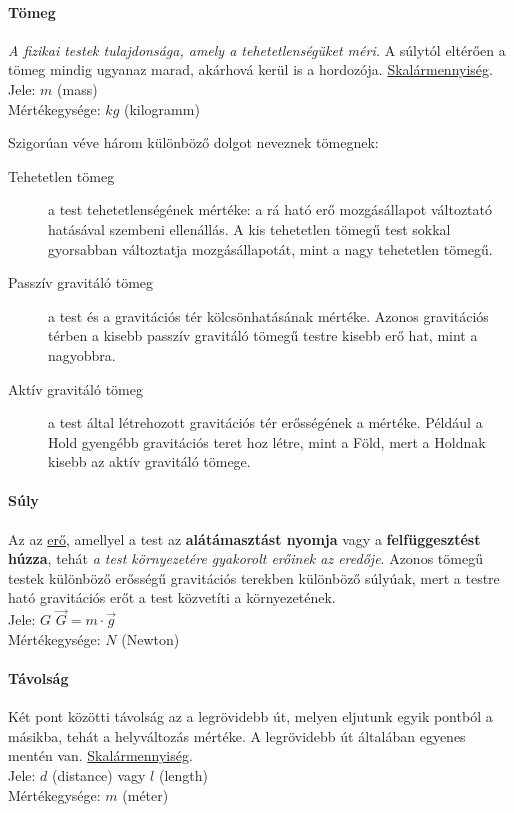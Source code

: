 \paragraph{Tömeg}
\emph{A fizikai testek tulajdonsága, amely a tehetetlenségüket méri.} A súlytól eltérően a tömeg mindig ugyanaz marad, akárhová kerül is a hordozója. \underline{Skalármennyiség}.\\
Jele: $m$ (mass)\\
Mértékegysége: $kg$ (kilogramm)

Szigorúan véve három különböző dolgot neveznek tömegnek:
\begin{description}
	\item[Tehetetlen tömeg] a test tehetetlenségének mértéke: a rá ható erő mozgásállapot változtató hatásával szembeni ellenállás. A kis tehetetlen tömegű test sokkal gyorsabban változtatja mozgásállapotát, mint a nagy tehetetlen tömegű.
	\item[Passzív gravitáló tömeg] a test és a gravitációs tér kölcsönhatásának mértéke. Azonos gravitációs térben a kisebb passzív gravitáló tömegű testre kisebb erő hat, mint a nagyobbra.
	\item[Aktív gravitáló tömeg] a test által létrehozott gravitációs tér erősségének a mértéke. Például a Hold gyengébb gravitációs teret hoz létre, mint a Föld, mert a Holdnak kisebb az aktív gravitáló tömege.
\end{description}

\paragraph{Súly}
Az az \underline{erő}, amellyel a test az \textbf{alátámasztást nyomja} vagy a \textbf{felfüggesztést húzza}, tehát \emph{a test környezetére gyakorolt erőinek az eredője}. Azonos tömegű testek különböző erősségű gravitációs terekben különböző súlyúak, mert a testre ható gravitációs erőt a test közvetíti a környezetének.\\
Jele: $G$ \quad $\vec{G} = m \cdot \vec{g}$\\
Mértékegysége: $N$ (Newton)

\paragraph{Távolság}
Két pont közötti távolság az a legrövidebb út, melyen eljutunk egyik pontból a másikba, tehát a helyváltozás mértéke. A legrövidebb út általában egyenes mentén van. \underline{Skalármennyiség}.\\
Jele: $d$ (distance) vagy $l$ (length)\\
Mértékegysége: $m$ (méter)

